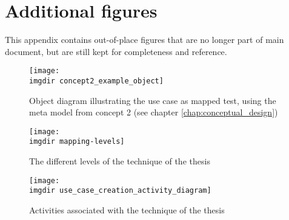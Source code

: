 \chapter{Additional figures}
This appendix contains out-of-place figures that are no longer part of main document, but are still kept for completeness and reference.

\begin{figure}[!htbp]
  \centering
  \texttt{[image: \\imgdir concept2\_example\_object]}
  \caption{Object diagram illustrating the use case as mapped test, using the meta model from concept 2 (see chapter \ref{chap:conceptual_design})}
  \label{fig:concept2_example_object}
\end{figure}

\begin{figure}[!hbpt]
\centering
\texttt{[image: \\imgdir mapping-levels]}
\caption{The different levels of the technique of the thesis}
\label{fig:mapping-levels}
\end{figure}

\begin{figure}[!hbpt]
\centering
\texttt{[image: \\imgdir use\_case\_creation\_activity\_diagram]}
\caption{Activities associated with the technique of the thesis}
\label{fig:use_case_creation_activity_diagram}
\end{figure}
